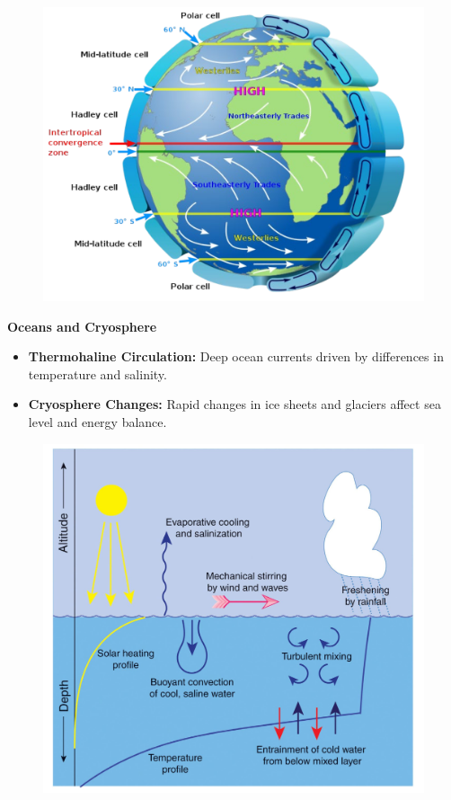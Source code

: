 \documentclass[fontsize=8pt, a4paper, landscape, fleqn]{scrartcl}
\renewcommand{\subsection}[1]{%
    \noindent\colorbox{subsectioncolor}{%
        \parbox{\dimexpr\columnwidth-2\fboxsep}{\color{white}\textbf{#1}}}%
    \vspace{0.5mm}%
}
\begin{document}
\begin{multicols*}{3}[\raggedcolumns]
\begin{figure}[H]
\end{figure}
\begin{figure}[H]
    \centering
    \includegraphics[width=1\linewidth]{CS//img/General_circulation_cells.png}
\end{figure}

\subsection{Oceans and Cryosphere}
\begin{itemize}
    \item \textbf{Thermohaline Circulation:} Deep ocean currents driven by differences in temperature and salinity.
    \item \textbf{Cryosphere Changes:} Rapid changes in ice sheets and glaciers affect sea level and energy balance.
\end{itemize}
\begin{figure}[H]
    \centering
    \includegraphics[width=0.8\linewidth]{CS//img/Athmosphere_Ocean_inteference.png}
\end{figure}

\end{multicols*}
\end{document}
